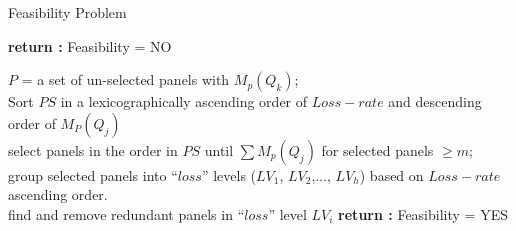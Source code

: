 \documentclass[journal]{IEEEtran}
\begin{document}
\begin{algorithm}[htbp]
  \caption{Feasibility Problem}
  \label{sec:algorithm-1}
  \LinesNumbered
  {
    {\textup{\textbf{return :}} Feasibility = NO\\
    }
  }

  {
    $P$ = a set of un-selected panels with $M_{p}(Q_{k})$;\\
     Sort $PS$ in a lexicographically ascending order of $Loss-rate$ and descending order of $M_{P}(Q_{j})$\\
     select panels in the order in $PS$ until $\sum M_{p}(Q_{j})$ for selected panels $\geq m$;\\
     group selected panels into ``$loss$'' levels ($LV_{1}$, $LV_{2}$,$\ldots$, $LV_{h}$) based on $Loss-rate$ ascending order.\\
     {
       find and remove redundant panels in ``$loss$'' level $LV_{i}$
     }
    }
    \textup{\textbf{return :}} Feasibility = YES
  \end{algorithm}
\end{document}

